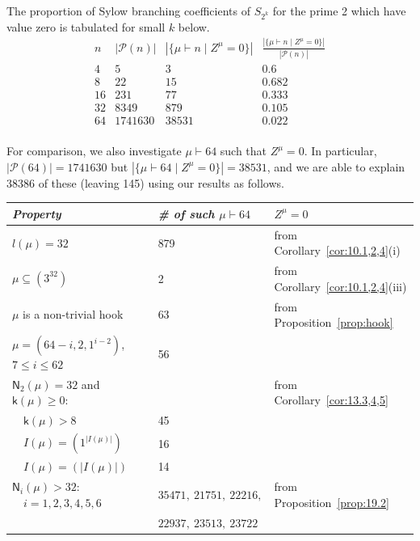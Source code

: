 \documentclass[ALCO, Unicode]{cedram}
\newcommand{\cP}{\mathcal{P}}
\newcommand{\sk}{\mathsf{k}}
\newcommand{\sn}{\mathsf{N}}
\begin{document}
\begin{example}
	The proportion of Sylow branching coefficients of $S_{2^k}$ for the prime 2 which have value zero is tabulated for small $k$ below.
	\[ \begin{array}{c|c|c|c}
		n & |\cP(n)| & |\{\mu\vdash n\mid Z^\mu=0\}| & \frac{|\{\mu\vdash n\mid Z^\mu=0\}|}{|\cP(n)|}\\
		\hline
		4 & 5 & 3 & 0.6\\
		8 & 22 & 15 & 0.682\\
		16 & 231 & 77 & 0.333\\
		32 & 8349 & 879 & 0.105\\
		64 & 1741630 & 38531 & 0.022\\
	\end{array} \]
	
	For comparison, we also investigate $\mu\vdash 64$ such that $Z^\mu=0$. In particular, $|\cP(64)|=1741630$ but $|\{\mu\vdash 64\mid Z^\mu=0\}|=38531$, and we are able to explain 38386 of these (leaving 145) using our results as follows.
	
	\smallskip
	\begin{small}
		\begin{tabular}{l|l|l}
			\textit{Property} & \textit{\# of such $\mu\vdash 64$} & \textit{$Z^\mu=0$} \\
			\hline
			$l(\mu)=32$ & 879 & from Corollary~\ref{cor:10.1,2,4}(i)\\
			$\mu\subseteq(3^{32})$ & 2 & from Corollary~\ref{cor:10.1,2,4}(iii)\\
			$\mu$ is a non-trivial hook & 63 & from Proposition~\ref{prop:hook}\\
			$\mu=(64-i,2,1^{i-2})$, $7\le i\le 62$ & 56 & \\
			$\sn_2(\mu)=32$ and $\sk(\mu)\ge 0$: & & from Corollary~\ref{cor:13.3,4,5}\\
			$\quad \sk(\mu)>8$ & 45 & \\
			$\quad I(\mu)=(1^{|I(\mu)|})$ & 16 & \\
			$\quad I(\mu)=(|I(\mu)|)$ & 14 & \\
			$\sn_i(\mu)>32$:$\quad i=1, 2, 3, 4, 5, 6$ & $35471,\ 21751,\ 22216,$ & from Proposition~\ref{prop:19.2}\\
			& $22937,\ 23513,\ 23722$ &\\
		\end{tabular}
	\end{small}

\end{example}
\end{document}
